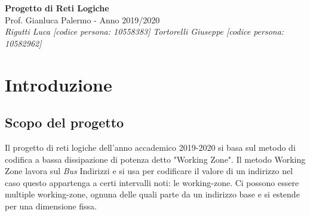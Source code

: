 \documentclass{article}
\begin{document}
\begin{titlepage}
   \begin{center}
      \Huge\textbf{Progetto di Reti Logiche}\\
      \vspace{5mm} %
      \Large Prof. Gianluca Palermo - Anno 2019/2020\\
      \vspace{5mm} %
      \large\textit{Rigutti Luca [codice persona: 10558383]}
      \linebreak
      \large\textit{Tortorelli Giuseppe [codice persona: 10582962]}
   \end{center}
\end{titlepage}
\printindex

\tableofcontents
\pagebreak

\section{Introduzione}
\subsection{Scopo del progetto}
Il progetto di reti logiche dell'anno accademico 2019-2020 si basa sul metodo di codifica a bassa dissipazione di potenza detto "Working Zone".
Il metodo Working Zone lavora sul \textit{Bus} Indirizzi e si usa per codificare il valore di un indirizzo nel caso questo appartenga a certi intervalli noti: le working-zone. Ci possono essere multiple working-zone, ognuna delle quali parte da un indirizzo base e si estende per una dimensione fissa.
\end{document}
